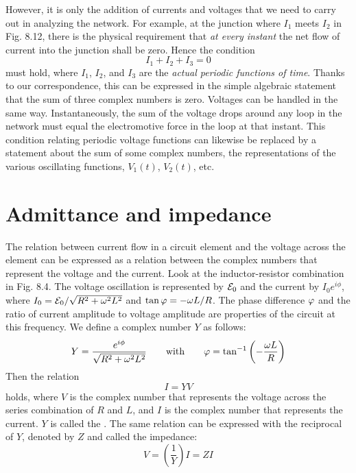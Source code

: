 However, it is only the addition of currents and voltages that we
need to carry out in analyzing the network. For example, at the
junction where $I_1$ meets $I_2$ in Fig. 8.12, there is the physical requirement
that \emph{at every instant} the net flow of current into the junction
shall be zero. Hence the condition
\begin{equation}
  I_1+I_2+I_3 = 0
\end{equation}
must hold, where $I_1$, $I_2$, and $I_3$ are the \emph{actual periodic functions of
time}. Thanks to our correspondence, this can be expressed in the
simple algebraic statement that the sum of three complex numbers
is zero. Voltages can be handled in the same way. Instantaneously,
the sum of the voltage drops around any loop in the network must
equal the electromotive force in the loop at that instant. This condition
relating periodic voltage functions can likewise be replaced by
a statement about the sum of some complex numbers, the representations
of the various oscillating functions, $V_1(t)$, $V_2(t)$, etc.

\section{Admittance and impedance}

The relation between current flow in a circuit element and the
voltage across the element can be expressed as a relation between the
complex numbers that represent the voltage and the current. Look
at the inductor-resistor combination in Fig. 8.4. The voltage oscillation
is represented by $\mathcal{E}_0$ and the current by $I_0e^{i\phi}$, where 
$I_0 = \mathcal{E}_0/\sqrt{R^2+\omega^2L^2}$ and $\tan \varphi = -\omega L/R$. The phase difference $\varphi$ and
the ratio of current amplitude to voltage amplitude are properties
of the circuit at this frequency. We define a complex number $Y$ as
follows:
\begin{equation}
  Y=\frac{e^{i\phi}}{\sqrt{R^2+\omega^2L^2}} \qquad \text{with} \qquad
          \varphi = \tan^{-1}\left(-\frac{\omega L}{R}\right)
\end{equation}
Then the relation
\begin{equation}
  I = YV
\end{equation}
holds, where $V$ is the complex number that represents the voltage
across the series combination of $R$ and $L$, and $I$ is the complex number
that represents the current. $Y$ is called the . The
same relation can be expressed with the reciprocal of $Y$, denoted by
$Z$ and called the impedance:
\begin{equation}
  V = \left(\frac{1}{Y}\right)I = ZI
\end{equation}

